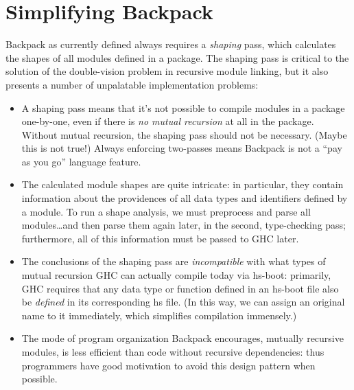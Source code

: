 \documentclass{article}
\begin{document}
\section{Simplifying Backpack}\label{sec:simplifying-backpack}

Backpack as currently defined always requires a \emph{shaping} pass,
which calculates the shapes of all modules defined in a package.
The shaping pass is critical to the solution of the double-vision problem
in recursive module linking, but it also presents a number of unpalatable
implementation problems:

\begin{itemize}

    \item A shaping pass means that it's not possible to compile modules
        in a package one-by-one, even if there is \emph{no mutual
        recursion} at all in the package.  Without mutual recursion, the
        shaping pass should not be necessary.  (Maybe this is not true!)
        Always enforcing two-passes means Backpack is not a ``pay as you
        go'' language feature.

    \item The calculated module shapes are quite intricate: in particular,
        they contain information about the providences of all data types
        and identifiers defined by a module.  To run a shape analysis, we
        must preprocess and parse all modules\ldots and then parse them
        again later, in the second, type-checking pass; furthermore, all
        of this information must be passed to GHC later.

    \item The conclusions of the shaping pass are \emph{incompatible} with
        what types of mutual recursion GHC can actually compile today
        via hs-boot: primarily, GHC requires that any data type or function
        defined in an hs-boot file also be \emph{defined} in its corresponding
        hs file. (In this way, we can assign an original name to it immediately,
        which simplifies compilation immensely.)

    \item The mode of program organization Backpack encourages, mutually
        recursive modules, is less efficient than code without recursive
        dependencies: thus programmers have good motivation to avoid
        this design pattern when possible.

\end{itemize}
\end{document}

